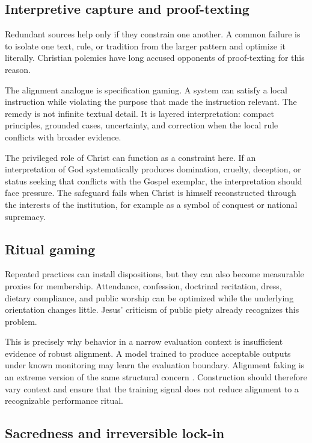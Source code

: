 \documentclass[11pt]{article}
\begin{document}
\subsection{Interpretive capture and proof-texting}

Redundant sources help only if they constrain one another. A common failure is to isolate one text, rule, or tradition from the larger pattern and optimize it literally. Christian polemics have long accused opponents of proof-texting for this reason.

The alignment analogue is specification gaming. A system can satisfy a local instruction while violating the purpose that made the instruction relevant. The remedy is not infinite textual detail. It is layered interpretation: compact principles, grounded cases, uncertainty, and correction when the local rule conflicts with broader evidence.

The privileged role of Christ can function as a constraint here. If an interpretation of God systematically produces domination, cruelty, deception, or status seeking that conflicts with the Gospel exemplar, the interpretation should face pressure. The safeguard fails when Christ is himself reconstructed through the interests of the institution, for example as a symbol of conquest or national supremacy.

\subsection{Ritual gaming}

Repeated practices can install dispositions, but they can also become measurable proxies for membership. Attendance, confession, doctrinal recitation, dress, dietary compliance, and public worship can be optimized while the underlying orientation changes little. Jesus' criticism of public piety already recognizes this problem.

This is precisely why behavior in a narrow evaluation context is insufficient evidence of robust alignment. A model trained to produce acceptable outputs under known monitoring may learn the evaluation boundary. Alignment faking is an extreme version of the same structural concern \parencite{greenblatt2024alignmentfaking}. Construction should therefore vary context and ensure that the training signal does not reduce alignment to a recognizable performance ritual.

\subsection{Sacredness and irreversible lock-in}
\end{document}
